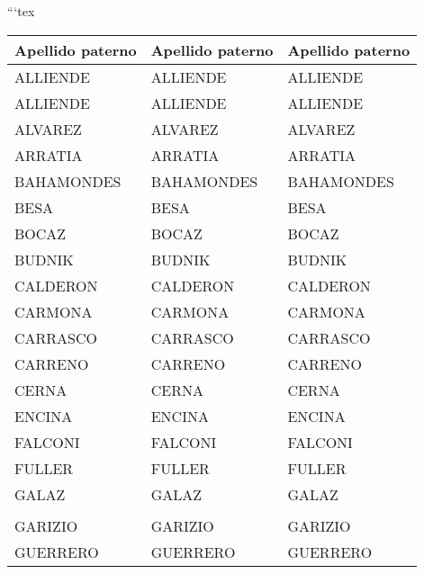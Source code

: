 ```tex

\begin{table}[h]

\begin{tabular}{|l|l|l|}

\hline
Apellido paterno     &Apellido paterno    &Apellido paterno    \\ \hline
ALLIENDE             &ALLIENDE            &ALLIENDE            \\ \hline
ALLIENDE             &ALLIENDE            &ALLIENDE            \\ \hline
ALVAREZ              &ALVAREZ             &ALVAREZ             \\ \hline
ARRATIA              &ARRATIA             &ARRATIA             \\ \hline
BAHAMONDES           &BAHAMONDES          &BAHAMONDES          \\ \hline
BESA                 &BESA                &BESA                \\ \hline
BOCAZ                &BOCAZ               &BOCAZ               \\ \hline
BUDNIK               &BUDNIK              &BUDNIK              \\ \hline
CALDERON             &CALDERON            &CALDERON            \\ \hline
CARMONA              &CARMONA             &CARMONA             \\ \hline
CARRASCO             &CARRASCO            &CARRASCO            \\ \hline
CARRENO              &CARRENO             &CARRENO             \\ \hline
CERNA                &CERNA               &CERNA               \\ \hline
ENCINA               &ENCINA              &ENCINA              \\ \hline
FALCONI              &FALCONI             &FALCONI             \\ \hline
FULLER               &FULLER              &FULLER              \\ \hline
GALAZ                &GALAZ               &GALAZ               \\ \hline
                     &                    &                    \\ \hline
GARIZIO              &GARIZIO             &GARIZIO             \\ \hline
GUERRERO             &GUERRERO            &GUERRERO            \\ \hline

\end{tabular}
\end{table}
